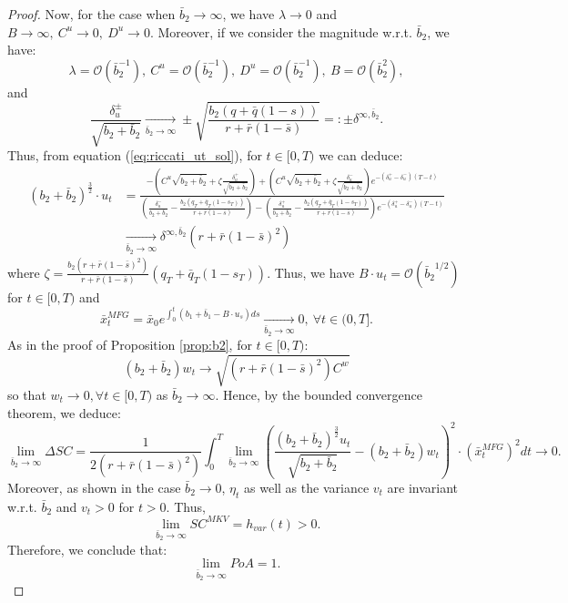 \documentclass[11pt]{article}
\begin{document}
\begin{proof}
	Now, for the case when $\bar{b}_2 \to \infty$,  we have $\lambda \to 0$
	and $B \to \infty,\ C^u \to 0,\ D^u \to 0$. Moreover, if we consider the magnitude w.r.t. $\bar{b}_2$, we have:
	$$ \lambda = \mathcal{O}(\bar{b}^{-1}_2),\ C^u = \mathcal{O}(\bar{b}_2^{-1}),\ D^u = \mathcal{O}(\bar{b}_2^{-1}),\ B = \mathcal{O}(\bar{b}_2^2),$$
	and 
	$$ \frac{\delta^\pm_u}{\sqrt{b_2 + \bar{b}_2}} \xrightarrow[\bar{b}_2 \to \infty]{} \pm \sqrt{ \frac{b_2 (q + \bar{q}(1-s))}{r + \bar{r}(1-\bar{s})} } =: \pm \delta^{\infty,\bar{b}_2}.$$
	Thus, from equation (\ref{eq:riccati_ut_sol}), for $t \in [0,T)$ we can deduce:
	\begin{equation*}
	\begin{split}
	 	(b_2 + \bar{b}_2)^{\frac{3}{2}}\cdot u_t &= \frac{ - \left( C^u\sqrt{b_2 + \bar{b}_2} + \zeta \frac{\delta^+_u}{\sqrt{b_2 + \bar{b}_2}}  \right) + \left( C^u\sqrt{b_2 + \bar{b}_2} + \zeta \frac{\delta^-_u}{\sqrt{b_2 + \bar{b}_2}}  \right) e^{- (\delta^+_u - \delta^-_u)(T-t)}}{ \left( \frac{\delta^-_u}{b_2 + \bar{b}_2} - \frac{b_2 (q_T + \bar{q}_T (1-s_T) )}{r + \bar{r}(1-\bar{s})} \right) - \left( \frac{\delta^+_u}{b_2 + \bar{b}_2} - \frac{b_2 (q_T + \bar{q}_T (1-s_T) )}{r + \bar{r}(1-\bar{s})} \right)e^{- (\delta^+_u - \delta^-_u)(T-t)} }\\
	 	& \xrightarrow[\bar{b}_2 \to \infty]{} \delta^{\infty, \bar{b}_2} (r + \bar{r}(1-\bar{s})^2) 
	 \end{split} 
	\end{equation*}
	where $\zeta = \frac{b_2 (r + \bar{r}(1-\bar{s})^2) }{r+ \bar{r}(1-\bar{s})} (q_T + \bar{q}_T(1-s_T))$. 
	Thus, we have $B \cdot u_t = \mathcal{O}\left({\bar{b}_2}^{1/2}\right)$ for $t \in [0,T)$ and 
	$$ \bar{x}_t^{MFG} = \bar{x}_0 e^{\int_0^t (b_1 + \bar{b}_1 - B\cdot u_s) ds} \xrightarrow[\bar{b}_2 \to \infty]{} 0,\ \forall t \in (0,T]. $$	
	As in the proof of Proposition \ref{prop:b2}, for $t \in [0,T)$:
	$$ (b_2 + \bar{b}_2) w_t \to \sqrt{(r + \bar{r}(1-\bar{s})^2) C^w}$$
	so that $w_t \to 0, \forall t \in [0,T)$ as $\bar{b}_2 \to \infty$. Hence, by the bounded convergence theorem, we deduce:
	$$ \lim_{\bar{b}_2 \to \infty} \Delta SC =  \frac{1}{2(r+ \bar{r}(1-\bar{s})^2)} \int_0^T \lim_{\bar{b}_2 \to \infty} \left( \frac{ (b_2 + \bar{b}_2)^{\frac{3}{2}} u_t }{\sqrt{b_2 + \bar{b}_2}} - (b_2 + \bar{b}_2)w_t \right)^2 \cdot \left(\bar{x}_t^{MFG} \right)^2 dt \to 0.
	$$	
	Moreover, as shown in the case $\bar{b}_2 \to 0$, $\eta_t$ as well as the variance $v_t$ are invariant w.r.t. $\bar{b}_2$ and $v_t>0$ for $t>0$. Thus,
	$$ \lim_{\bar{b}_2 \to \infty} SC^{MKV} = h_{var}(t)> 0.$$
	Therefore, we conclude that:
	$$ \lim_{\bar{b}_2 \to \infty} PoA = 1.$$
\end{proof}
\end{document}
